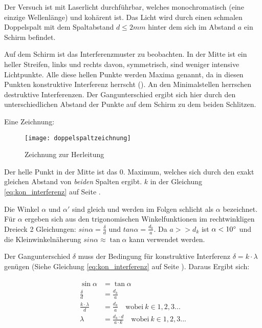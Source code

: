 Der Versuch ist mit Laserlicht durchführbar, welches monochromatisch (eine einzige Wellenlänge) und kohärent ist. Das Licht wird durch einen schmalen Doppelspalt mit dem Spaltabstand $d \leq 2mm$ hinter dem sich im Abstand $a$ ein Schirm befindet. 
	
Auf dem Schirm ist das Interferenzmuster zu beobachten. In der Mitte ist ein heller Streifen, links und rechts davon, symmetrisch, sind weniger intensive Lichtpunkte. Alle diese hellen Punkte werden Maxima genannt, da in diesen Punkten konstruktive Interferenz herrscht (). An den Minimalstellen herrschen destruktive Interferenzen. Der Gangunterschied ergibt sich hier durch den unterschiedlichen Abstand der Punkte auf dem Schirm zu dem beiden Schlitzen.

Eine Zeichnung:

\begin{figure}[h!]
		\centering
		\texttt{[image: doppelspaltzeichnung]}
		\caption{Zeichnung zur Herleitung}
\end{figure}

Der helle Punkt in der Mitte ist das 0. Maximum, welches sich durch den exakt gleichen Abstand von \emph{beiden} Spalten ergibt. $k$ in der Gleichung \ref{eq:kon_interferenz} auf Seite \pageref{eq:kon_interferenz}.
	
Die Winkel $\alpha$ und $\alpha '$ sind gleich und werden im Folgen schlicht als $\alpha$ bezeichnet. Für $\alpha$ ergeben sich aus den trigonomischen Winkelfunktionen im rechtwinkligen Dreieck 2 Gleichungen: $sin{\alpha}=\frac{\delta}{d}$ und $tan{\alpha}=\frac{d_k}{a}$. Da $a>>d_k$ ist $\alpha<10 \degree$ und die Kleinwinkelnäherung $sin{\alpha} \approx \tan{\alpha}$ kann verwendet werden.

Der Gangunterschied $\delta$ muss der Bedingung für konstruktive Interferenz $\delta = k \cdot \lambda$ genügen (Siehe Gleichung \ref{eq:kon_interferenz} auf Seite \pageref{eq:kon_interferenz}). Daraus Ergibt sich:
	
\begin{align}
\begin{split}
	\sin{\alpha} &= \tan{\alpha} \\
	\frac{\delta}{d} &= \frac{d_k}{a} \\
	\frac{k \cdot \lambda}{d} &= \frac{d_k}{a} \quad \text{wobei} \ k \in 1,2,3... \\
	\lambda &= \frac{d_{k} \cdot d}{a \cdot k} \quad \text{wobei} \ k \in 1,2,3...
\end{split}
\end{align}
	

